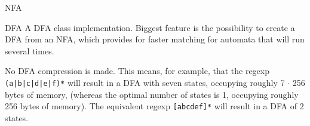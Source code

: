 
\begin{algorithm}{NFA}
\end{algorithm}

\begin{algorithm}{DFA}
\desc
A DFA class implementation. Biggest feature is the possibility to create a
DFA from an NFA, which provides for faster matching for automata that will
run several times.

No DFA compression is made. This means, for example, that the regexp
{\tt (a|b|c|d|e|f)*} will result in a DFA with seven states, occupying
roughly 7 $\cdot$ 256 bytes of memory, (whereas the optimal number of states
is 1, occupying roughly 256 bytes of memory). The equivalent regexp
{\tt [abcdef]*} will result in a DFA of 2 states.
\end{algorithm}
